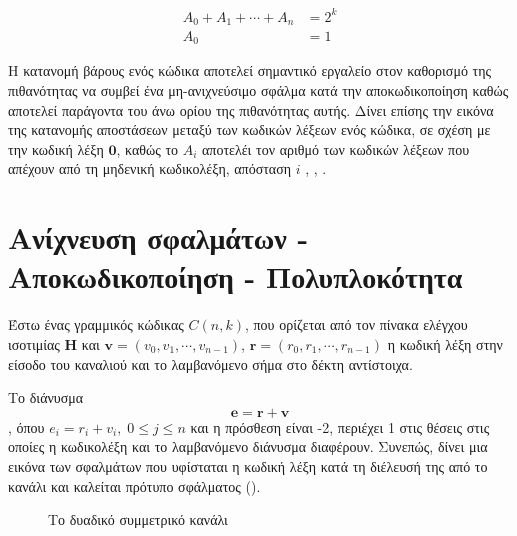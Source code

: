 \begin{equation}
\begin{aligned}
A_0+A_1+\cdots+A_n& = 2^k \\ 
Α_0 & =  1
\end{aligned}
\end{equation}

Η κατανομή βάρους ενός κώδικα αποτελεί σημαντικό εργαλείο στον καθορισμό της πιθανότητας να συμβεί ένα μη-ανιχνεύσιμο σφάλμα κατά την αποκωδικοποίηση καθώς αποτελεί παράγοντα του άνω ορίου της πιθανότητας αυτής. Δίνει επίσης την εικόνα της κατανομής αποστάσεων μεταξύ των κωδικών λέξεων ενός κώδικα, σε σχέση με την κωδική λέξη $\mathbf{0}$, καθώς το $A_i$ αποτελέι τον αριθμό των κωδικών λέξεων που απέχουν από τη μηδενική κωδικολέξη, απόσταση $i$ \cite{ryan2009channel}, \cite{macwilliams1977theory}, \cite{peterson1972error}.

\section{Ανίχνευση σφαλμάτων - Αποκωδικοποίηση - Πολυπλοκότητα}

Έστω ένας γραμμικός  κώδικας $C(n,k)$, που ορίζεται από τον πίνακα ελέγχου ισοτιμίας $\mathbf{H}$ και $\mathbf{v}=\left(v_0, v_1,\cdots,v_{n-1}\right)$, $\mathbf{r}=\left(r_0, r_1,\cdots,r_{n-1}\right)$ η κωδική λέξη στην είσοδο του καναλιού και το λαμβανόμενο σήμα στο δέκτη αντίστοιχα.

Το διάνυσμα $$\mathbf{e}=\mathbf{r}+\mathbf{v}$$, όπου $e_i=r_i+v_i,\;0\leq j\leq n$ και η πρόσθεση είναι -2, περιέχει 1 στις θέσεις στις οποίες η κωδικολέξη και το λαμβανόμενο διάνυσμα διαφέρουν. Συνεπώς, δίνει μια εικόνα των σφαλμάτων που υφίσταται η κωδική λέξη κατά τη διέλευσή της από το  κανάλι και καλείται πρότυπο σφάλματος ().

\begin{figure}[h]
\caption{Το δυαδικό συμμετρικό κανάλι}
\label{fig:BSC channel}
\end{figure}

